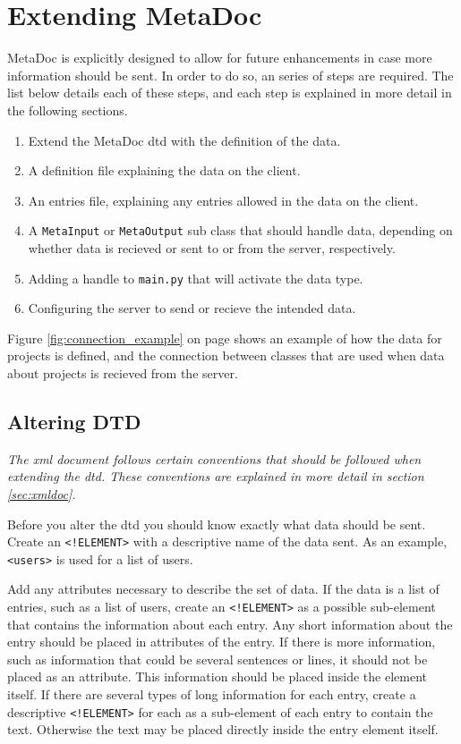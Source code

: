 \newpage
\section{Extending MetaDoc}
\label{sec:extending}
MetaDoc is explicitly designed to allow for future enhancements in case more
information should be sent. In order to do so, an series of steps are required.
The list below details each of these steps, and each step is explained in more
detail in the following sections.

\begin{enumerate}
    \item
        Extend the MetaDoc \gls{dtd} with the definition of the data.
    \item
        A definition file explaining the data on the client.
    \item
        An entries file, explaining any entries allowed in the data on the 
        client.
    \item
        A \texttt{MetaInput} or \texttt{MetaOutput} sub class that should
        handle data, depending on whether data is recieved or sent to or from
        the server, respectively.
    \item
        Adding a handle to \texttt{main.py} that will activate the data type.
    \item
        Configuring the server to send or recieve the intended data.
\end{enumerate}

Figure \ref{fig:connection_example} on page \pageref{fig:connection_example}
shows an example of how the data for projects is defined, and the connection
between classes that are used when data about projects is recieved from the
server.


\subsection{Altering DTD}
\textit{The \gls{xml} document follows certain conventions that should be
followed when extending the \gls{dtd}. These conventions are explained in more
detail in section \ref{sec:xmldoc}.}

Before you alter the \gls{dtd} you should know exactly what data should be
sent.  Create an \texttt{<!ELEMENT>} with a descriptive name of the data sent.
As an example, \texttt{<users>} is used for a list of users. 

Add any attributes necessary to describe the set of data. If the data is a list
of entries, such as a list of users, create an \texttt{<!ELEMENT>} as a
possible sub-element that contains the information about each entry. Any short
information about the entry should be placed in attributes of the entry. If
there is more information, such as information that could be several sentences
or lines, it should not be placed as an attribute. This information should be
placed inside the element itself. If there are several types of long
information for each entry, create a descriptive \texttt{<!ELEMENT>} for each
as a sub-element of each entry to contain the text. Otherwise the text may be
placed directly inside the entry element itself. 

